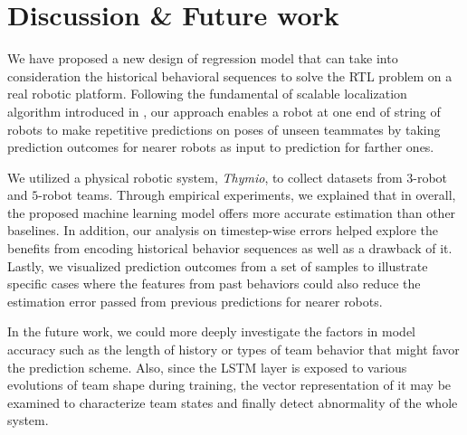 \documentclass[letterpaper, 10 pt, conference]{ieeeconf}  %
\begin{document}
	\section{Discussion \& Future work}
	\label{sec:discussion_and_future_work}
	
	We have proposed a new design of regression model that can take into consideration 
	the historical behavioral sequences to solve the RTL problem on a real robotic platform. 
	Following the fundamental of scalable localization algorithm introduced in \cite{CPR17}, 
	our approach enables a robot at one end of string of robots to make repetitive predictions 
	on poses of unseen teammates by taking prediction outcomes for nearer robots as input to 
	prediction for farther ones.
	
	We utilized a physical robotic system, \emph{Thymio}, to collect datasets from 
	$3$-robot and $5$-robot teams. Through empirical experiments, we explained that in overall,
	the proposed machine learning model offers more accurate estimation than other baselines.
	In addition, our analysis on timestep-wise errors helped 
	explore the benefits from encoding historical behavior sequences as well as a
	drawback of it. Lastly, we visualized prediction outcomes from a set of samples to 
	illustrate specific cases where the features from past behaviors could also reduce the 
	estimation error passed from previous predictions for nearer robots. 
	
	In the future work, we could more deeply investigate the factors in model accuracy such as 
	the length of history or types of team behavior that might favor the prediction scheme. 
	Also, since the LSTM layer is exposed 
	to various evolutions of team shape during training, the vector representation of it 
	may be examined to characterize team states and finally detect abnormality of the whole
	system. 
	 
	
{\small
	
	
}
\end{document}
